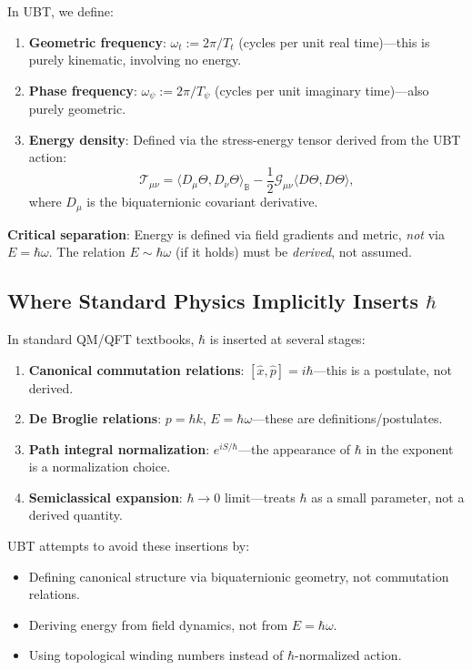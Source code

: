 \documentclass[12pt]{article}
\begin{document}
In UBT, we define:
\begin{enumerate}
\item \textbf{Geometric frequency}: $\omega_t := 2\pi/T_t$ (cycles per unit real time)---this is purely kinematic, involving no energy.

\item \textbf{Phase frequency}: $\omega_\psi := 2\pi/T_\psi$ (cycles per unit imaginary time)---also purely geometric.

\item \textbf{Energy density}: Defined via the stress-energy tensor derived from the UBT action:
\[
\mathcal{T}_{\mu\nu} = \langle D_\mu \Theta, D_\nu \Theta \rangle_\mathbb{B} - \frac{1}{2} \mathcal{G}_{\mu\nu} \langle D\Theta, D\Theta \rangle,
\]
where $D_\mu$ is the biquaternionic covariant derivative.
\end{enumerate}

\textbf{Critical separation}: Energy is defined via field gradients and metric, \emph{not} via $E = \hbar\omega$. The relation $E \sim \hbar\omega$ (if it holds) must be \emph{derived}, not assumed.

\subsection{Where Standard Physics Implicitly Inserts $\hbar$}

In standard QM/QFT textbooks, $\hbar$ is inserted at several stages:

\begin{enumerate}
\item \textbf{Canonical commutation relations}: $[\hat{x}, \hat{p}] = i\hbar$---this is a postulate, not derived.

\item \textbf{De Broglie relations}: $p = \hbar k$, $E = \hbar \omega$---these are definitions/postulates.

\item \textbf{Path integral normalization}: $e^{iS/\hbar}$---the appearance of $\hbar$ in the exponent is a normalization choice.

\item \textbf{Semiclassical expansion}: $\hbar \to 0$ limit---treats $\hbar$ as a small parameter, not a derived quantity.
\end{enumerate}

UBT attempts to avoid these insertions by:
\begin{itemize}
\item Defining canonical structure via biquaternionic geometry, not commutation relations.
\item Deriving energy from field dynamics, not from $E = \hbar\omega$.
\item Using topological winding numbers instead of $\hbar$-normalized action.
\end{itemize}
\end{document}
